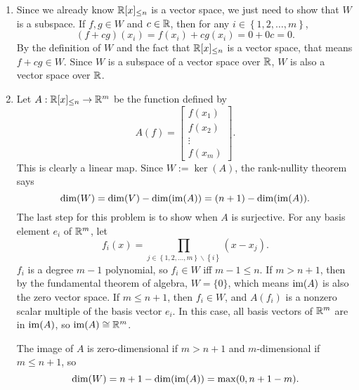 \documentclass{article}
\begin{document}
\bigskip
\begin{prob}
\end{prob}
\begin{enumerate}[label=(\alph*)]
    \item Since we already know $\mathbb{R}[x]_{\leq n}$ is a vector space, we just need to show that $W$ is a subspace. If $f, g \in W$ and $c \in \mathbb{R}$, then for any $i \in \left\{ 1,2, \dots, m \right\}$,
        \[ (f+cg)(x_i)=f(x_i)+cg(x_i)=0+0c=0. \]
        By the definition of $W$ and the fact that $\mathbb{R}[x]_{\leq n}$ is a vector space, that means $f+cg \in W$. Since $W$ is a subspace of a vector space over $\mathbb{R}$, $W$ is also a vector space over $\mathbb{R}$.
    \item Let $A: \mathbb{R}[x]_{\leq n} \rightarrow \mathbb{R}^m$ be the function defined by
        \[ A(f) = \begin{bmatrix}
            f(x_1) \\
            f(x_2) \\
            \vdots \\
            f(x_m)
        \end{bmatrix}. \]
        This is clearly a linear map. Since $W := \ker(A)$, the rank-nullity theorem says
        \[ \dim(W) = \dim(V) - \dim(\operatorname{im}(A)) = (n+1) - \dim(\operatorname{im}(A)). \]
        The last step for this problem is to show when $A$ is surjective. For any basis element $e_i$ of $\mathbb{R}^m$, let
        \[ f_i(x) = \prod_{j \in \left\{ 1,2,\dots,m \right\} \backslash \left\{ i \right\}} (x-x_j). \]
        $f_i$ is a degree $m-1$ polynomial, so $f_i \in W$ iff $m-1 \leq n$. If $m > n+1$, then by the fundamental theorem of algebra, $W=\{0\}$, which means $\operatorname{im}(A)$ is also the zero vector space. If $m \leq n+1$, then $f_i \in W$, and $A(f_i)$ is a nonzero scalar multiple of the basis vector $e_i$. In this case, all basis vectors of $\mathbb{R}^m$ are in $\operatorname{im}(A)$, so $\operatorname{im}(A) \cong \mathbb{R}^m$.
        \par
        The image of $A$ is zero-dimensional if $m > n+1$ and $m$-dimensional if $m \leq n+1$, so
        \[ \dim(W) = n+1-\dim(\operatorname{im}(A)) = \max(0, n+1-m). \]
\end{enumerate}



\end{document}
